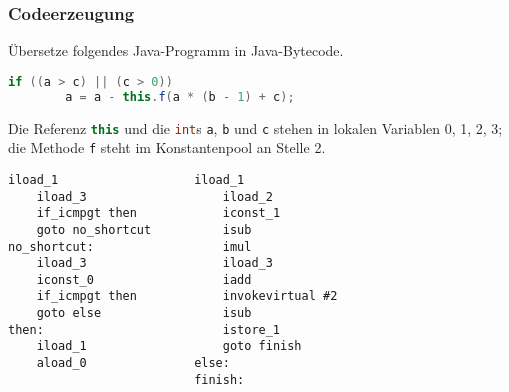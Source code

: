 \documentclass{beamer}
\begin{document}
\begin{frame}[fragile]
  \frametitle{Codeerzeugung}
  Übersetze folgendes Java-Programm in Java-Bytecode.
  \begin{lstlisting}[language=Java]
    if ((a > c) || (c > 0))
        a = a - this.f(a * (b - 1) + c);
  \end{lstlisting}
  Die Referenz \lstinline[language=Java]{this} und die \lstinline[language=Java]{int}s \lstinline{a}, \lstinline{b} und \lstinline{c} stehen in lokalen Variablen 0, 1, 2, 3;
  die Methode \lstinline{f} steht im Konstantenpool an Stelle 2.
  \pause
  \begin{lstlisting}[language=jasmin,autogobble=false]
    iload_1                   iload_1           
    iload_3                   iload_2           
    if_icmpgt then            iconst_1          
    goto no_shortcut          isub              
no_shortcut:                  imul              
    iload_3                   iload_3           
    iconst_0                  iadd              
    if_icmpgt then            invokevirtual #2  
    goto else                 isub              
then:                         istore_1          
    iload_1                   goto finish       
    aload_0               else:                 
                          finish:
  \end{lstlisting}
\end{frame}
\end{document}
